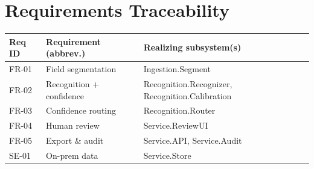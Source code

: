 \documentclass[11pt,letterpaper]{article}
\begin{document}
\section{Requirements Traceability}
\begin{table}[H]\begin{center}\begin{tabular}{ | p{2cm} | p{5.5cm} | p{5cm} |}\hline
\textbf{Req ID} & \textbf{Requirement (abbrev.)} & \textbf{Realizing subsystem(s)} \\ \hline
FR-01 & Field segmentation & Ingestion.Segment \\ \hline
FR-02 & Recognition + confidence & Recognition.Recognizer, Recognition.Calibration \\ \hline
FR-03 & Confidence routing & Recognition.Router \\ \hline
FR-04 & Human review & Service.ReviewUI \\ \hline
FR-05 & Export \& audit & Service.API, Service.Audit \\ \hline
SE-01 & On-prem data & Service.Store \\ \hline
\end{tabular}\end{center}\end{table}


{}
\end{document}
